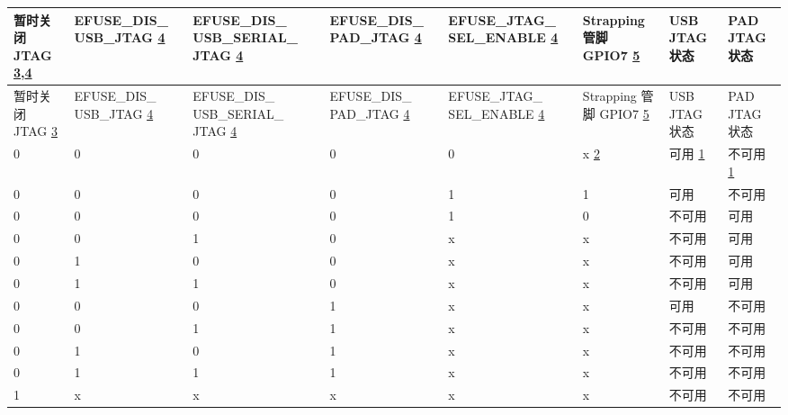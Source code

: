 
\begin{longtable}{ | p{1.4cm} | p{1.9cm} | p{2.1cm} | p{1.9cm} | p{2.1cm} | p{1.4cm} | p{1.7cm} | p{2.0cm} | }
\hline\rowcolor{lightgray}
暂时关闭 JTAG \hyperref[JTAG footnote: 3]{3},\hyperref[JTAG footnote: 4]{4} & EFUSE\_DIS\_ USB\_JTAG \hyperref[JTAG footnote: 4]{4} & EFUSE\_DIS\_ USB\_SERIAL\_ JTAG \hyperref[JTAG footnote: 4]{4} & EFUSE\_DIS\_ PAD\_JTAG \hyperref[JTAG footnote: 4]{4} & EFUSE\_JTAG\_ SEL\_ENABLE \hyperref[JTAG footnote: 4]{4} & Strapping 管脚 GPIO7 \hyperref[JTAG footnote: 5]{5} & USB JTAG 状态 & PAD JTAG 状态 \\ \hline
\endfirsthead
\hline
\rowcolor{lightgray}
暂时关闭 JTAG \hyperref[JTAG footnote: 3]{3} & EFUSE\_DIS\_ USB\_JTAG \hyperref[JTAG footnote: 4]{4} & EFUSE\_DIS\_ USB\_SERIAL\_ JTAG \hyperref[JTAG footnote: 4]{4} & EFUSE\_DIS\_ PAD\_JTAG \hyperref[JTAG footnote: 4]{4} & EFUSE\_JTAG\_ SEL\_ENABLE \hyperref[JTAG footnote: 4]{4} & Strapping 管脚 GPIO7  \hyperref[JTAG footnote: 5]{5} & USB JTAG 状态 & PAD JTAG 状态 \\ \hline
\hline
\endhead
\endfoot

0 & 0 & 0 & 0 & 0 & x \hyperref[JTAG footnote: 2]{2}	& 可用	 \hyperref[JTAG footnote: 1]{1}  &     不可用  \hyperref[JTAG footnote: 1]{1}  \\\hline
0 & 0 & 0 & 0 & 1 & 1	& 可用	 &  不可用   \\\hline
0 & 0 & 0 & 0 & 1 & 0	& 不可用 & 	可用 \\\hline
0 & 0 & 1 & 0 & x & x	& 不可用 & 	可用 \\\hline
0 & 1 & 0 & 0 & x & x	& 不可用 & 	可用 \\\hline
0 & 1 & 1 & 0 & x & x	& 不可用 & 	可用 \\\hline
0 & 0 & 0 & 1 & x & x	& 可用	 &  不可用 \\\hline
0 & 0 & 1 & 1 & x & x	& 不可用 & 	不可用 \\\hline
0 & 1 & 0 & 1 & x & x	& 不可用 & 	不可用 \\\hline
0 & 1 & 1 & 1 & x & x	& 不可用 & 	不可用 \\\hline
1 & x & x & x & x & x	& 不可用 & 	不可用 \\\hline

\end{longtable}


